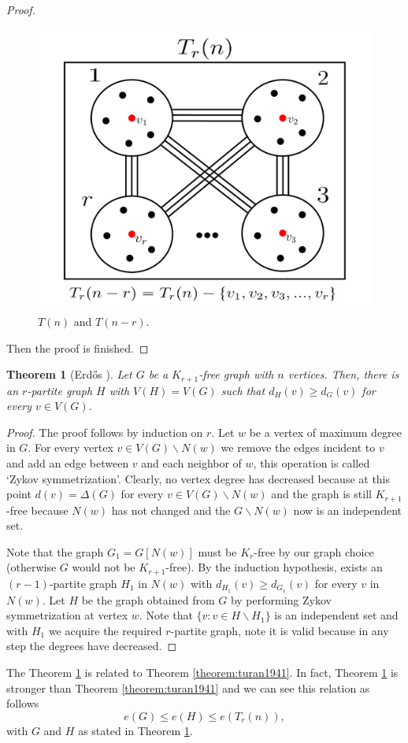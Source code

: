 \documentclass[12pt,twoside,a4paper,bibliography=totocnumbered]{book}
\numberwithin{equation}{section}
\let\setminus=\smallsetminus
\newtheorem{theorem}             {Theorem}[section]
\theoremstyle{remark}
\begin{document}
\begin{proof}
 \begin{figure}[H]
     \centering
     \includegraphics[scale=1]{Figuras/t(n)-and-t(n-r)}
     \caption{$T(n)$ and $T(n-r)$.}
     \label{fig:t(n)-and-t(n-r)}
\end{figure}
Then the proof is finished.
\end{proof}

\begin{theorem}[{Erd\H{o}s \cite{Er70}}]\label{theorem:erdos1970} Let $G$ be a $ K_{r+1}$-free graph with $n$ vertices. Then, there is an $ r$-partite graph $H$ with $V(H) = V(G)$ such that $d_H(v) \geq d_G(v)$ for every $v \in V(G)$.\\
\end{theorem}

\begin{proof}
The proof follows by induction on $r$. Let $w$ be a vertex of maximum degree in $G$. For every vertex $v \in V(G)\setminus N(w)$ we remove the edges incident to $v$ and add an edge between $v$ and each neighbor of $w$, this operation is called `Zykov symmetrization'. Clearly, no vertex degree has decreased because at this point $d(v) = \Delta(G)$ for every $v \in V(G)\setminus N(w)$ and the graph is still $K_{r+1}$-free because $N(w)$ has not changed and the $G\setminus N(w)$ now is an independent set.

Note that the graph $G_1=G[N(w)]$ must be $K_r$-free by our graph choice (otherwise $G$ would not be $K_{r+1}$-free). By the induction hypothesis, exists an $(r-1)$-partite graph $H_1$ in $N(w)$ with $d_{H_1}(v) \geq d_{G_1}(v)$ for every $v$ in $N(w)$. Let $H$ be the graph obtained from $G$ by performing Zykov symmetrization at vertex $w$. Note that $\{v: v \in H\setminus H_1\}$ is an independent set and with $H_1$ we acquire the required $r$-partite graph, note it is valid because in any step the degrees have decreased.
\end{proof}
The Theorem \ref{theorem:erdos1970} is related to Theorem \ref{theorem:turan1941}. In fact, Theorem \ref{theorem:erdos1970} is stronger than Theorem \ref{theorem:turan1941} and we can see this relation as follows $$e(G) \leq e(H) \leq e(T_r(n)),$$
with $G$ and $H$ as stated in Theorem \ref{theorem:erdos1970}.
\end{document}
